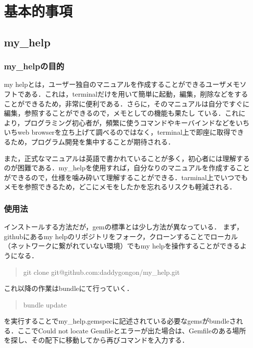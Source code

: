 \chapter{基本的事項}\label{ux57faux672cux7684ux4e8bux9805}

\section{my\_help}\label{my_help}

\subsection{my\_helpの目的}\label{my_helpux306eux76eeux7684}

my
helpとは，ユーザー独自のマニュアルを作成することができるユーザメモソフトである．これは，terminalだけを用いて簡単に起動，編集，削除などをすることができるため，非常に便利である．さらに，そのマニュアルは自分ですぐに編集，参照することができるので，メモとしての機能も果たし
ている．これにより，プログラミング初心者が，頻繁に使うコマンドやキーバインドなどをいちいちweb
browserを立ち上げて調べるのではなく，terminal上で即座に取得できるため，プログラム開発を集中することが期待される．

また，正式なマニュアルは英語で書かれていることが多く，初心者には理解するのが困難である．my\_helpを使用すれば，自分なりのマニュアルを作成することができるので，仕様を噛み砕いて理解することができる．tarminal上でいつでもメモを参照できるため，どこにメモをしたかを忘れるリスクも軽減される．

\subsection{使用法}\label{ux4f7fux7528ux6cd5}

インストールする方法だが，gemの標準とは少し方法が異なっている．
まず，githubにあるmy
helpのリポジトリをフォーク，クローンすることでローカル（ネットワークに繋がれていない環境）でもmy
helpを操作することができるようになる．

\begin{quote}
git clone git@github.com:daddygongon/my\_help.git\n
\end{quote}
これ以降の作業はbundleにて行っていく．

\begin{quote}
bundle update
\end{quote}
を実行することでmy\_help.gemspecに記述されている必要なgemsがbundleされる．ここでCould
not locate
Gemfileとエラーが出た場合は、Gemfileのある場所を探し、その配下に移動してから再びコマンドを入力する．


